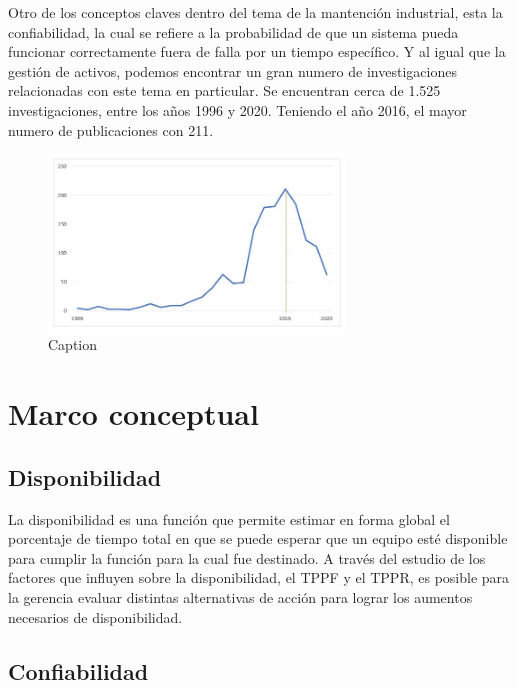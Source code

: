 \documentclass[]{article}
\begin{document}
Otro de los conceptos claves dentro del tema de la mantención industrial, esta la confiabilidad, la cual se refiere a la probabilidad de que un sistema pueda funcionar correctamente fuera de falla por un tiempo específico. Y al igual que la gestión de activos, podemos encontrar un gran numero de investigaciones relacionadas con este tema en particular. Se encuentran cerca de 1.525 investigaciones, entre los años 1996 y 2020. Teniendo el año 2016, el mayor numero de publicaciones con 211.

\begin{figure}[!h]
    \centering
    \includegraphics[width=0.7\textwidth]{2.JPG}
    \caption{Caption}
    \label{fig:my_label}
\end{figure}

\hypertarget{marco-conceptual-descripcion-detallada}{%
\section{Marco conceptual}
\label{marco-conceptual-descripcion-detallada}}

\subsection{Disponibilidad}


La disponibilidad es una función que permite estimar en forma global el porcentaje de tiempo total en que se puede esperar que un equipo esté disponible para cumplir la función para la cual fue destinado. A través del estudio de los factores que influyen sobre la disponibilidad, el TPPF y el TPPR, es posible para la gerencia evaluar distintas alternativas de acción para lograr los aumentos necesarios de disponibilidad.\cite{amendola2003indicadores}

\subsection{Confiabilidad}
\end{document}
